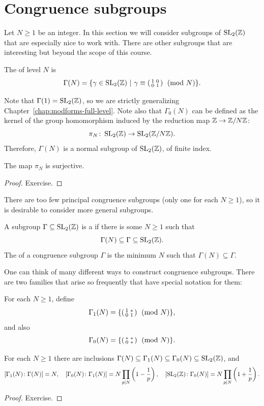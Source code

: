 \section{Congruence subgroups}
\label{sec:congruence-subgroups}

Let $N\geq 1$ be an integer. In this section we will consider subgroups of $\operatorname{SL}_2(\mathbb{Z})$ that are especially nice to work with. There are other subgroups that are interesting but beyond the scope of this course.
\begin{definition}
  The  of level $N$ is
\[
\Gamma(N)=\{ \gamma\in\operatorname{SL}_2(\mathbb{Z})~|~ \gamma\equiv \left(\begin{smallmatrix}1&0\\0&1\end{smallmatrix}\right) \pmod{N}\}.
\]
\end{definition}

Note that $\Gamma(1)=\operatorname{SL}_2(\mathbb{Z})$, so we are strictly generalizing Chapter~\ref{chap:modforms-full-level}. Note also that $\Gamma_0(N)$ can be defined as the kernel of the group homomorphism induced by the reduction map $\mathbb{Z}\to \mathbb{Z}/N\mathbb{Z}$:
\[
\pi_N\colon \operatorname{SL}_2(\mathbb{Z})\to \operatorname{SL}_2(\mathbb{Z}/N\mathbb{Z}).
\]
Therefore, $\Gamma(N)$ is a normal subgroup of $\operatorname{SL}_2(\mathbb{Z})$, of finite index.
\begin{proposition}
  The map $\pi_N$ is surjective.
\end{proposition}
\begin{proof}
  Exercise.
\end{proof}
There are too few principal congruence subgroups (only one for each $N\geq 1$), so it is desirable to consider more general subgroups.
\begin{definition}
  A subgroup $\Gamma\subseteq \operatorname{SL}_2(\mathbb{Z})$ is a  if there is some $N\geq 1$ such that
\[
\Gamma(N)\subseteq \Gamma \subseteq \operatorname{SL}_2(\mathbb{Z}).
\]
The  of a congruence subgroup $\Gamma$ is the minimum $N$ such that $\Gamma(N)\subseteq \Gamma$.
\end{definition}

One can think of many different ways to construct congruence subgroups. There are two families that arise so frequently that have special notation for them:

\begin{example}
For each $N\geq 1$, define
  \[
\Gamma_1(N)=\{\left(\begin{smallmatrix}1&*\\0&1\end{smallmatrix}\right)\pmod N\},
\]
and also
  \[
\Gamma_0(N)=\{\left(\begin{smallmatrix}*&*\\0&*\end{smallmatrix}\right)\pmod N\}.
\]
\end{example}

\begin{lemma}
  For each $N\geq 1$ there are inclusions
$\Gamma(N) \subseteq \Gamma_1(N) \subseteq \Gamma_0(N) \subseteq \operatorname{SL}_2(\mathbb{Z})$,
and
\[
[\Gamma_1(N)\colon \Gamma(N)] = N,\quad [\Gamma_0(N)\colon \Gamma_1(N)] = N\prod_{p\mid N} \left(1-\frac 1p\right),\quad [\operatorname{SL}_2(\mathbb{Z})\colon \Gamma_0(N)] = N\prod_{p\mid N} \left(1+\frac 1p\right).
\]
\end{lemma}
\begin{proof}
  Exercise.
\end{proof}


